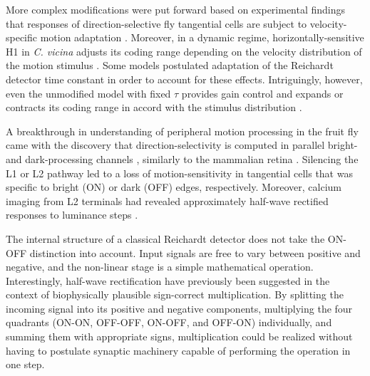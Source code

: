 More complex modifications were put forward based on experimental findings that responses of direction-selective fly tangential cells are subject to velocity-specific motion adaptation \citep{Harris:1999kj}. Moreover, in a dynamic regime, horizontally-sensitive H1 in \textit{C. vicina} adjusts its coding range depending on the velocity distribution of the motion stimulus \citep{Brenner:2000aa,Fairhall:2001aa}. Some models postulated adaptation of the Reichardt detector time constant in order to account for these effects. Intriguingly, however, even the unmodified model with fixed $\tau$ provides gain control and expands or contracts its coding range in accord with the stimulus distribution \citep{Borst:2005dr}.

A breakthrough in understanding of peripheral motion processing in the fruit fly came with the discovery that direction-selectivity is computed in parallel bright- and dark-processing channels \citep{Joesch:2010fw}, similarly to the mammalian retina \citep{Borst:2015ko}. Silencing the L1 or L2 pathway led to a loss of motion-sensitivity in tangential cells that was specific to bright (ON) or dark (OFF) edges, respectively. Moreover, calcium imaging from L2 terminals had revealed approximately half-wave rectified responses to luminance steps \citep{Reiff:2010eo}.

The internal structure of a classical Reichardt detector does not take the ON-OFF distinction into account. Input signals are free to vary between positive and negative, and the non-linear stage is a simple mathematical operation. Interestingly, half-wave rectification have previously been suggested in the context of biophysically plausible sign-correct multiplication. By splitting the incoming signal into its positive and negative components, multiplying the four quadrants (ON-ON, OFF-OFF, ON-OFF, and OFF-ON) individually, and summing them with appropriate signs, multiplication could be realized without having to postulate synaptic machinery capable of performing the operation in one step.

